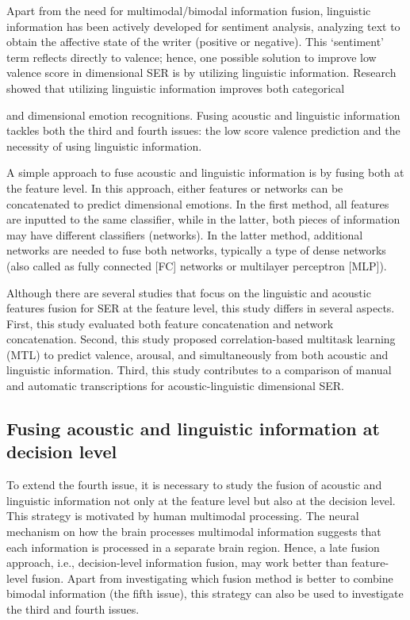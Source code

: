 Apart from the need for multimodal/bimodal information fusion, linguistic
information has been actively developed for sentiment analysis, analyzing text
to obtain the affective state of the writer (positive or negative).  This
`sentiment' term reflects directly to valence; hence, one possible solution to
improve low valence score in dimensional SER is by utilizing linguistic
information. Research showed that utilizing linguistic information improves
both categorical {\cite{ Yoon2018} and dimensional \cite{Karadogan2012} emotion
recognitions. Fusing acoustic and linguistic information tackles both the third
and fourth issues: the low score valence prediction and the necessity of using linguistic information.

A simple approach to fuse acoustic and linguistic information is by fusing both
at the feature level. In this approach, either features or networks can be
concatenated to predict dimensional emotions. In the first method, all features
are inputted to the same classifier, while in the latter, both pieces of
information may have different classifiers (networks). In the latter method,
additional networks are needed to fuse both networks, typically a type of dense
networks (also called as fully connected [FC] networks or multilayer perceptron
[MLP]).

Although there are several studies that focus on the linguistic and acoustic
features fusion for SER at the feature level, this study differs in several
aspects. First, this study evaluated both feature concatenation and network
concatenation. Second, this study proposed correlation-based multitask learning
(MTL) to predict valence, arousal, and simultaneously from both acoustic and
linguistic information. Third, this study contributes to a comparison of manual
and automatic transcriptions for acoustic-linguistic dimensional SER.

\subsection{Fusing acoustic and linguistic information at decision level}
To extend the fourth issue, it is necessary to study the fusion of acoustic and
linguistic information not only at the feature level but also at the decision
level. This strategy is motivated by human multimodal processing. The neural
mechanism on how the brain processes multimodal information suggests that each
information is processed in a separate brain region. Hence, a late fusion
approach, i.e., decision-level information fusion, may work better than
feature-level fusion. Apart from investigating which fusion method is better to
combine bimodal information (the fifth issue), this strategy can also be used
to investigate the third and fourth issues.

}
